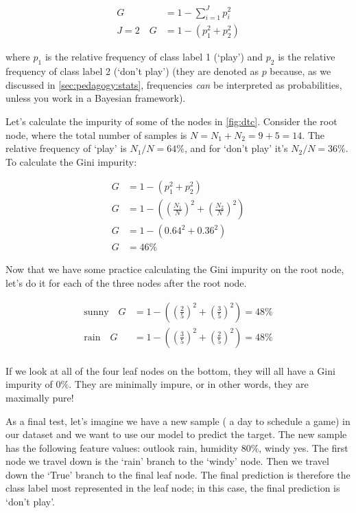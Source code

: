 \begin{align}
    G &= 1 - \sum_{i=1}^{J} p_i^2 \\
    J=2 \quad G &= 1 - (p_1^2 + p_2^2)
\end{align}

\noindent where $p_1$ is the relative frequency of class label 1 (`play') and $p_2$ is the relative frequency of class label 2 (`don't play')  (they are denoted as $p$ because, as we discussed in \autoref{sec:pedagogy:stats}, frequencies \emph{can} be interpreted as probabilities, unless you work in a Bayesian framework).

Let's calculate the impurity of some of the nodes in \autoref{fig:dtc}. Consider the root node, where the total number of samples is $N=N_1+N_2=9+5=14$. The relative frequency of `play' is $N_1/N=64\%$, and for `don't play' it's $N_2/N=36\%$. To calculate the Gini impurity:

\begin{align*}
    G &= 1 - (p_1^2 + p_2^2) \\
    G &= 1 - \left( \left(\frac{N_1}{N}\right)^2 + \left(\frac{N_2}{N}\right)^2 \right) \\
    G &= 1 - \left( 0.64^2 + 0.36^2 \right) \\
    G &= 46\%
\end{align*}

\noindent Now that we have some practice calculating the Gini impurity on the root node, let's do it for each of the three nodes after the root node.

\begin{align*}
    \text{sunny} \quad G &= 1 - \left( \left(\frac{2}{5}\right)^2 + \left(\frac{3}{5}\right)^2 \right) = 48\% \\
    \text{rain} \quad G &= 1 - \left( \left(\frac{3}{5}\right)^2 + \left(\frac{2}{5}\right)^2 \right) = 48\% \\
\end{align*}

\noindent If we look at all of the four leaf nodes on the bottom, they will all have a Gini impurity of $0\%$. They are minimally impure, or in other words, they are maximally pure!

As a final test, let's imagine we have a new sample (\ie{} a day to schedule a game) in our dataset and we want to use our model to predict the target. The new sample has the following feature values: outlook rain, humidity $80\%$, windy yes. The first node we travel down is the `rain' branch to the `windy' node. Then we travel down the `True' branch to the final leaf node. The final prediction is therefore the class label most represented in the leaf node; in this case, the final prediction is `don't play'.


